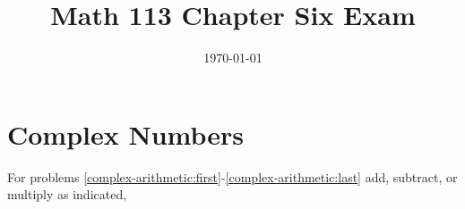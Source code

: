 \documentclass[fleqn,addpoints]{exam}
\title{Math 113 Chapter Six Exam}
\author{}
\date{\today}
\begin{document}
\maketitle

\ifprintanswers
\else
\vspace{0.2in}
\vspace{0.2in}

\begin{center}
\gradetable[h][pages]
\end{center}

\fi

\section{Complex Numbers}

For problems \ref{complex-arithmetic:first}-\ref{complex-arithmetic:last} add, subtract, or multiply as indicated, 
\end{document}
